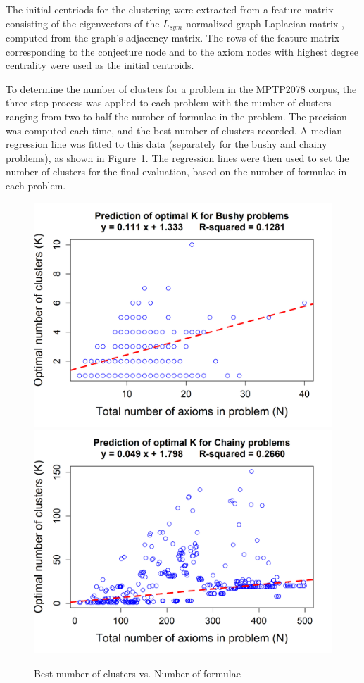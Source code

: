 \documentclass[EPiC]{easychair}
\begin{document}
The initial centriods for the clustering were extracted from a feature matrix 
consisting of the eigenvectors of the $L_{sym}$ normalized graph Laplacian 
matrix \cite{vLu07}, computed from the graph's adjacency matrix.
The rows of the feature matrix corresponding to the conjecture node and to 
the axiom nodes with highest degree centrality were used as the initial 
centroids.

To determine the number of clusters for a problem in the MPTP2078 corpus,
the three step process was applied to each problem with the number of 
clusters ranging from two to half the number of formulae in the problem.
The precision was computed each time, and the best number of clusters
recorded.
A median regression line was fitted to this data (separately for the
bushy and chainy problems), as shown in Figure~\ref{fig:median-regression}.
The regression lines were then used to set the number of clusters for
the final evaluation, based on the number of formulae in each problem.

\begin{figure}[h]
\centering
\includegraphics[scale=0.42]{median-regression-optimal-k-bushy.png}
\includegraphics[scale=0.42]{median-regression-optimal-k-chainy.png}
\caption{Best number of clusters vs. Number of formulae}
\label{fig:median-regression}
\end{figure}
\end{document}
